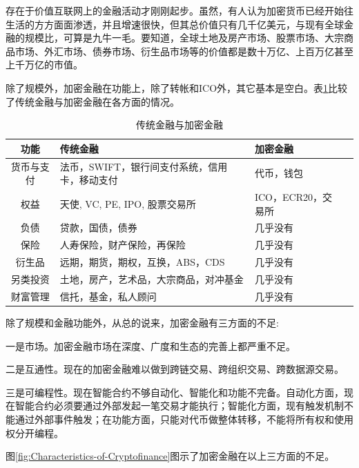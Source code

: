 \documentclass[a4paper,12pt]{article}
\begin{document}
存在于价值互联网上的金融活动才刚刚起步。虽然，有人认为加密货币已经开始往生活的方方面面渗透，并且增速很快，但其总价值只有几千亿美元，与现有全球金融的规模比，可算是九牛一毛。要知道，全球土地及房产市场、股票市场、大宗商品市场、外汇市场、债券市场、衍生品市场等的价值都是数十万亿、上百万亿甚至上千万亿的市值。

除了规模外，加密金融在功能上，除了转帐和ICO外，其它基本是空白。表\ref{tbl:cryptofinance}比较了传统金融与加密金融在各方面的情况。

\renewcommand\tablename{表}
\begin{table}[!hpb]\small
  \caption{传统金融与加密金融}
  \label{tbl:cryptofinance}
  \centering
  \begin{tabular}{|c|p{}|l|p{}|}
\hline
功能	&	传统金融	&	加密金融	\\
\hline
货币与支付	&	法币，SWIFT，银行间支付系统，信用卡，移动支付	&	代币，钱包	\\
权益	&	天使, VC, PE, IPO, 股票交易所	&	ICO，ECR20，交易所	\\
负债	&	贷款，国债，债券	&	几乎没有	\\
保险	&	人寿保险，财产保险，再保险	&	几乎没有	\\
衍生品	&	远期，期货，期权，互换，ABS，CDS	&	几乎没有	\\
另类投资	&	土地，房产，艺术品，大宗商品，对冲基金	&	几乎没有	\\
财富管理	&	信托，基金，私人顾问	&	几乎没有	\\
\hline
 \end{tabular}
\end{table}

除了规模和金融功能外，从总的说来，加密金融有三方面的不足:

一是市场。加密金融市场在深度、广度和生态的完善上都严重不足。

二是互通性。现在的加密金融难以做到跨链交易、跨组织交易、跨数据源交易。

三是可编程性。现在智能合约不够自动化、智能化和功能不完备。自动化方面，现在智能合约必须要通过外部发起一笔交易才能执行；智能化方面，现有触发机制不能通过外部事件触发；在功能方面，只能对代币做整体转移，不能将所有权和使用权分开编程。

图\ref{fig:Characteristics-of-Cryptofinance}图示了加密金融在以上三方面的不足。
\end{document}
